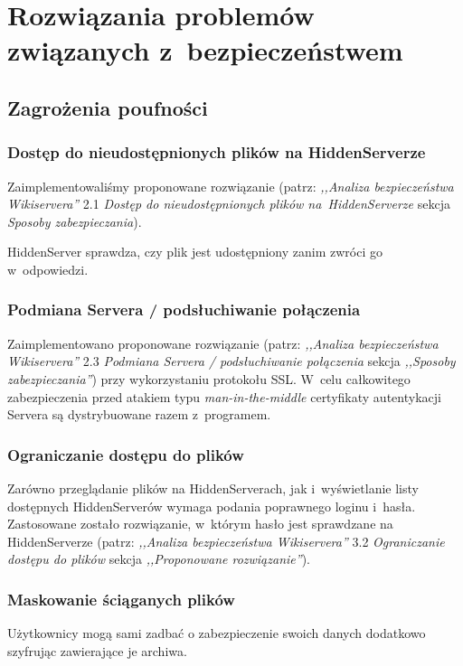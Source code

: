 \documentclass[a4paper,notitlepage]{article}
\begin{document}
\pagestyle{fancy}

\section{Rozwiązania problemów związanych z~bezpieczeństwem}
\subsection{Zagrożenia poufności}
\subsubsection{Dostęp do nieudostępnionych plików na HiddenServerze}
Zaimplementowaliśmy proponowane rozwiązanie (patrz: \emph{,,Analiza
bezpieczeństwa Wikiservera''} 2.1 \emph{Dostęp do nieudostępnionych
plików na~HiddenServerze} sekcja \emph{Sposoby zabezpieczania}). 

HiddenServer sprawdza, czy plik jest udostępniony zanim zwróci go 
w~odpowiedzi.

\subsubsection{Podmiana Servera / podsłuchiwanie połączenia}
Zaimplementowano proponowane rozwiązanie (patrz: \emph{,,Analiza
bezpieczeństwa Wikiservera''} 2.3 \emph{Podmiana Servera / podsłuchiwanie 
połączenia}
sekcja \emph{,,Sposoby zabezpieczania''}) przy wykorzystaniu protokołu
SSL. W~celu całkowitego zabezpieczenia przed atakiem typu 
\emph{man-in-the-middle} certyfikaty autentykacji Servera są dystrybuowane
razem z~programem.

\subsubsection{Ograniczanie dostępu do plików}
Zarówno przeglądanie plików na HiddenServerach, jak i~wyświetlanie
listy dostępnych HiddenServerów wymaga podania poprawnego loginu
i~hasła. Zastosowane zostało rozwiązanie, w~którym hasło jest 
sprawdzane na HiddenServerze (patrz: \emph{,,Analiza
bezpieczeństwa Wikiservera''} 3.2 \emph{Ograniczanie dostępu do plików}
sekcja \emph{,,Proponowane rozwiązanie''}).
\subsubsection{Maskowanie ściąganych plików}
Użytkownicy mogą sami zadbać o zabezpieczenie swoich danych dodatkowo szyfrując zawierające je archiwa.
\end{document}
